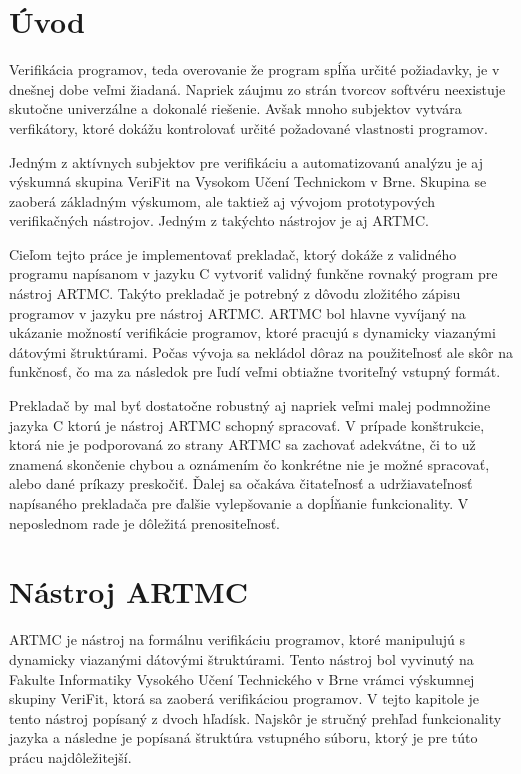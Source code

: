 
\chapter{Úvod}
Verifikácia programov, teda overovanie že program spĺňa určité požiadavky, je v dnešnej dobe veľmi žiadaná. Napriek záujmu zo strán tvorcov softvéru neexistuje skutočne univerzálne a dokonalé riešenie. Avšak mnoho subjektov vytvára verfikátory, ktoré dokážu kontrolovať určité požadované vlastnosti programov.

Jedným z aktívnych subjektov pre verifikáciu a automatizovanú analýzu je aj výskumná skupina VeriFit na Vysokom Učení Technickom v Brne. Skupina se zaoberá základným výskumom, ale taktiež aj vývojom prototypových verifikačných nástrojov. Jedným z takýchto nástrojov je aj ARTMC.

Cieľom tejto práce je implementovať prekladač, ktorý dokáže z validného programu napísanom v jazyku C vytvoriť validný funkčne rovnaký program pre nástroj ARTMC. Takýto prekladač je potrebný z dôvodu zložitého zápisu programov v jazyku pre nástroj ARTMC. ARTMC bol hlavne vyvíjaný na ukázanie možností verifikácie programov, ktoré pracujú s dynamicky viazanými dátovými štruktúrami. Počas vývoja sa nekládol dôraz na použiteľnosť ale skôr na funkčnosť, čo ma za následok pre ľudí veľmi obtiažne tvoriteľný vstupný formát.

Prekladač by mal byť dostatočne robustný aj napriek veľmi malej podmnožine jazyka C ktorú je nástroj ARTMC schopný spracovať. V prípade konštrukcie, ktorá nie je podporovaná zo strany ARTMC sa zachovať adekvátne, či to už znamená skončenie chybou a oznámením čo konkrétne nie je možné spracovať, alebo dané príkazy preskočiť. Ďalej sa očakáva čitateľnosť a udržiavateľnosť napísaného prekladača pre ďalšie vylepšovanie a dopĺňanie funkcionality. V neposlednom rade je dôležitá prenositeľnosť.


\chapter{Nástroj ARTMC}
\label{kap_artmc}
ARTMC je nástroj na formálnu verifikáciu programov, ktoré manipulujú s
dynamicky viazanými dátovými štruktúrami. Tento nástroj bol vyvinutý na Fakulte
Informatiky Vysokého Učení Technického v Brne vrámci výskumnej skupiny VeriFit,
ktorá sa zaoberá verifikáciou programov. V tejto kapitole je tento nástroj
popísaný z dvoch hľadísk. Najskôr je stručný prehľad funkcionality jazyka a
následne je popísaná štruktúra vstupného súboru, ktorý je pre túto prácu
najdôležitejší.

